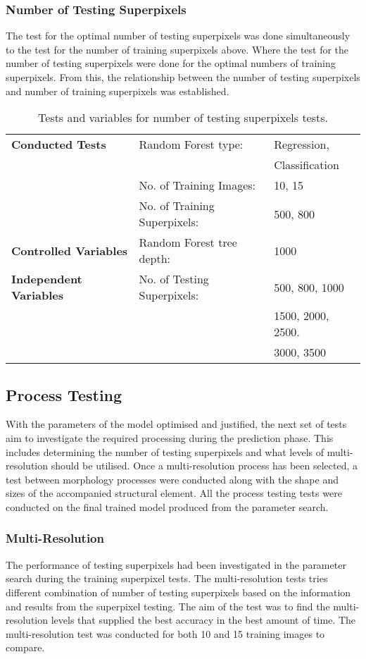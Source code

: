 \subsubsection{Number of Testing Superpixels}
The test for the optimal number of testing superpixels was done simultaneously to the test for the number of training superpixels above. Where the test for the number of testing superpixels were done for the optimal numbers of training superpixels. From this, the relationship between the number of testing superpixels and number of training superpixels was established. 

\begin{table}[H]
\centering
\caption{Tests and variables for number of testing superpixels tests.}

\begin{tabular}{|l|ll|}
\hline
\textbf{Conducted Tests}	& Random Forest type: & Regression,\\
	& 	& Classification\\		
	&  No. of Training Images: & 10, 15\\
	& No. of Training Superpixels: & 500, 800\\
\hline
\textbf{Controlled Variables} & Random Forest tree depth: & 1000 \\
\hline
\textbf{Independent Variables} & No. of Testing Superpixels: & 500, 800, 1000\\
	&	& 1500, 2000, 2500.\\
	&	& 3000, 3500\\
\hline				    	 			   			    	 
\end{tabular}
\label{table:testpix}
\end{table}



\subsection{Process Testing}
With the parameters of the model optimised and justified, the next set of tests aim to investigate the required processing during the prediction phase. This includes determining the number of testing superpixels and what levels of multi-resolution should be utilised. Once a multi-resolution process has been selected, a test between morphology processes were conducted along with the shape and sizes of the accompanied structural element. All the process testing tests were conducted on the final trained model produced from the parameter search. 

\subsubsection{Multi-Resolution}
The performance of testing superpixels had been investigated in the parameter search during the training superpixel tests. The multi-resolution tests tries different combination of number of testing superpixels based on the information and results from the superpixel testing. The aim of the test was to find the multi-resolution levels that supplied the best accuracy in the best amount of time. The multi-resolution test was conducted for both 10 and 15 training images to compare. 

